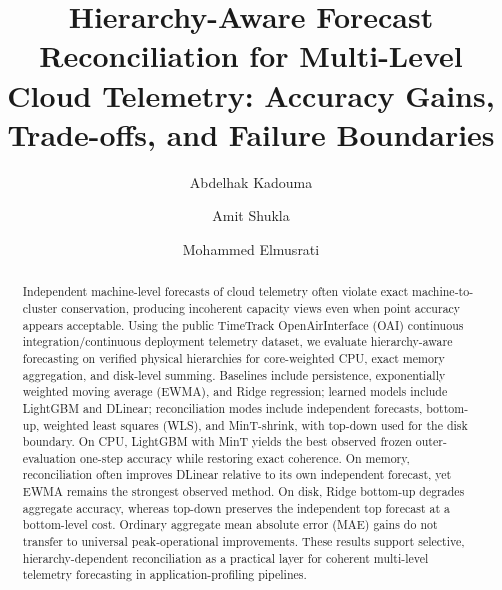 \documentclass[a4paper,fleqn]{cas-dc}
\begin{document}
\let\WriteBookmarks\relax


\title[mode=title]{Hierarchy-Aware Forecast Reconciliation for Multi-Level Cloud Telemetry: Accuracy Gains, Trade-offs, and Failure Boundaries}

\author[1]{Abdelhak Kadouma}
\cormark[1]

\author[1]{Amit Shukla}

\author[1]{Mohammed Elmusrati}



\begin{abstract}
Independent machine-level forecasts of cloud telemetry often violate exact
machine-to-cluster conservation, producing incoherent capacity views even when
point accuracy appears acceptable. Using the public TimeTrack OpenAirInterface
({OAI}) continuous integration/continuous deployment telemetry dataset, we
evaluate hierarchy-aware forecasting on verified physical hierarchies for
core-weighted {CPU}, exact memory aggregation, and disk-level summing.
Baselines include persistence, exponentially weighted moving average ({EWMA}),
and Ridge regression; learned models include LightGBM and DLinear; reconciliation
modes include independent forecasts, bottom-up, weighted least squares ({WLS}),
and MinT-shrink, with top-down used for the disk boundary.
On {CPU}, LightGBM with MinT yields the best observed frozen outer-evaluation
one-step accuracy while restoring exact coherence.
On memory, reconciliation often improves DLinear relative to its own independent
forecast, yet {EWMA} remains the strongest observed method.
On disk, Ridge bottom-up degrades aggregate accuracy, whereas top-down preserves
the independent top forecast at a bottom-level cost.
Ordinary aggregate mean absolute error ({MAE}) gains do not transfer to universal
peak-operational improvements.
These results support selective, hierarchy-dependent reconciliation as a practical
layer for coherent multi-level telemetry forecasting in application-profiling
pipelines.
\end{abstract}
\end{document}
